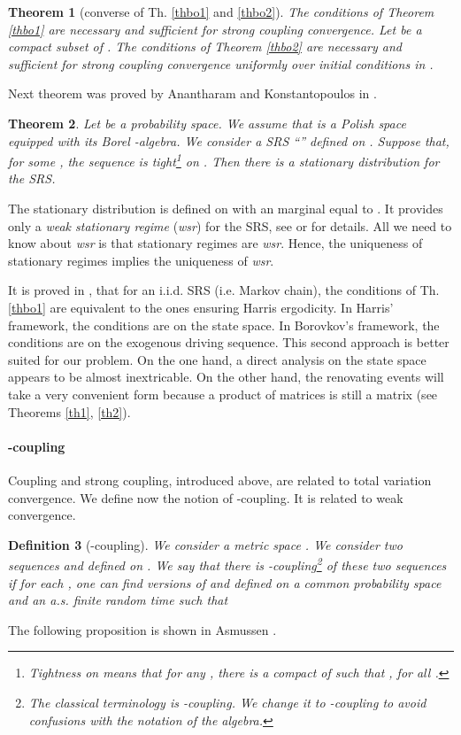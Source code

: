 \documentclass[11pt,titlepage]{article}
\newcommand{\parag}{\medskip\noindent}
\newtheorem{theo}{Theorem }[section]
\newtheorem{defi}[theo]{Definition }
\begin{document}
\begin{theo}[converse of Th. \ref{thbo1} and \ref{thbo2}]
\label{thbo2c}
The conditions of Theorem \ref{thbo1} are  necessary and sufficient for strong
coupling 
convergence. Let  be a compact subset of . The conditions of
Theorem \ref{thbo2} are  necessary and sufficient for strong coupling
convergence 
uniformly
over initial conditions in .
\end{theo}

Next theorem was proved
by Anantharam and Konstantopoulos in \cite{AnKo}.

\begin{theo}
\label{anko}
Let  be a probability space. We assume that  is
a Polish space equipped with its Borel -algebra.
We consider a SRS ``'' defined on .
Suppose that,
for some , the sequence 
is tight\footnote{Tightness on  means that for any , there is a compact  of  such that , for all .} on .
Then there is a stationary distribution for the SRS.
\end{theo}
The stationary
distribution is defined on  with an  marginal 
equal to . It
provides only a {\it weak
stationary regime} ({\it wsr}) for the SRS, 
see \cite{AnKo} or \cite{BFLi} for details. 
All we need to know about {\it wsr} is that
stationary regimes are {\it wsr}. Hence, the uniqueness of
stationary regimes implies the uniqueness of {\it wsr}. 

\parag
It is proved in \cite{BoFo92}, that for an i.i.d. SRS (i.e. Markov chain), 
the conditions of Th. \ref{thbo1}
are equivalent 
to the ones ensuring
Harris ergodicity. 
In Harris' framework, the conditions are on
the state 
space. In Borovkov's framework, the conditions are on the exogenous driving
sequence. This second approach is better suited for our problem.  On the one
hand, a direct analysis on the state
space appears to be almost inextricable. 
On the other hand, the 
renovating events will take a very convenient form because a
product 
of matrices is still a matrix (see Theorems \ref{th1}, \ref{th2}).

\paragraph{-coupling}
Coupling and strong coupling, introduced 
above, are related to total variation convergence. 
We define now the notion of -coupling. It is related to weak 
convergence.

\begin{defi}[-coupling]
We consider a metric space . We consider two sequences  and  defined on . We say that there 
is -coupling\footnote{The classical terminology is
-coupling. We change it to -coupling to
avoid confusions with the notation  of the  algebra.}
of  
these two sequences if for each , one 
can find versions of  and  defined on a common probability
space and an a.s. finite random time  such that 

\label{eps} 
\end{defi}
The following proposition is shown in Asmussen \cite{asmu92}.
\end{document}
